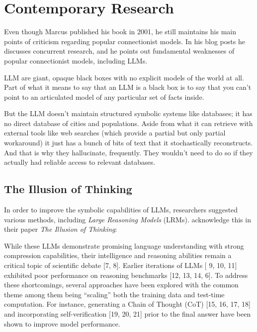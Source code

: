 \documentclass[../../main.tex]{subfiles}
\begin{document}
\chapter{Contemporary Research}
Even though Marcus published his book in 2001, he still maintains his main points of criticism regarding popular connectionist models. In his blog posts he discusses concurrent research, and he points out fundamental weaknesses of popular connectionist models, including LLMs.

\begin{citecallout}
    LLM are giant, opaque black boxes with no explicit models of the world at all. Part of what it means to say that an LLM is a black box is to say that you can’t point to an articulated model of any particular set of facts inside.
\end{citecallout}

\begin{citecallout}
    But the LLM doesn't maintain structured symbolic systems like databases; it has no direct database of cities and populations. Aside from what it can retrieve with external tools like web searches (which provide a partial but only partial workaround) it just has a bunch of bits of text that it stochastically reconstructs. And that is why they hallucinate, frequently. They wouldn't need to do so if they actually had reliable access to relevant databases.
\end{citecallout}

\section{The Illusion of Thinking}
In order to improve the symbolic capabilities of LLMs, researchers suggested various methods, including \emph{Large Reasoning Models} (LRMs). \textcite{illusion-of-thinking} acknowledge this in their paper \emph{The Illusion of Thinking}:

\begin{newcite}
    While these LLMs demonstrate promising
    language understanding with strong compression capabilities, their intelligence and reasoning abilities
    remain a critical topic of scientific debate [7, 8]. Earlier iterations of LLMs [ 9, 10, 11] exhibited
    poor performance on reasoning benchmarks [12, 13, 14, 6]. To address these shortcomings, several
    approaches have been explored with the common theme among them being “scaling” both the training
    data and test-time computation. For instance, generating a Chain of Thought (CoT) [15, 16, 17, 18]
    and incorporating self-verification [19, 20, 21] prior to the final answer have been shown to improve
    model performance.
\end{newcite}
\end{document}
